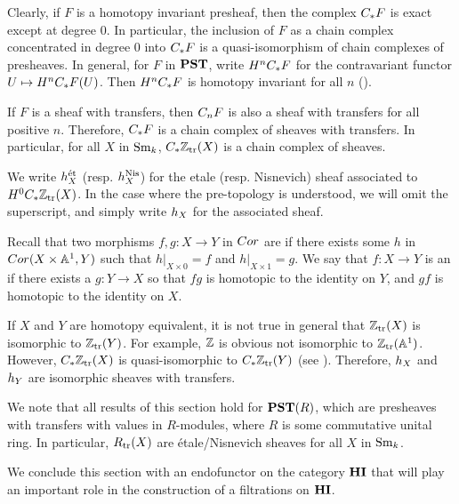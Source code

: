 Clearly, if $F$ is a homotopy invariant presheaf, then the complex 
$\suslC F$ is exact except at degree $0$. In particular, the
inclusion of $F$ as a chain complex concentrated in degree $0$ into
$\suslC F$ is a quasi-isomorphism of chain complexes of presheaves.
In general, for $F$ in $\PST$, write $H^n \suslC F$ for the 
contravariant functor $U \mapsto H^n \suslC F(U)$. Then $H^n \suslC F$
is homotopy invariant for all $n$ (\cite[2.19]{MVW}).

If $F$ is a sheaf with transfers, then $\suslC[n] F$ is also a sheaf
with transfers for all positive $n$. Therefore, $\suslC F$ is a
chain complex of sheaves with transfers. In particular, for all
$X$ in $\Sm$, $\suslC \Ztr(X)$ is a chain complex of sheaves.

\begin{defn}\label{def_hSX}
We write $\hS{X}^{\mathrm{\acute{e}t}}$ (resp. $\hS{X}^{\Nis}$) 
for the etale (resp. Nisnevich) sheaf associated to $H^0 \suslC 
\Ztr(X)$. In the case where the pre-topology is understood, we will
omit the superscript, and simply write $\hS{X}$ for the associated
sheaf.
\end{defn}

\begin{rmk}
Recall that two morphisms $f, g: X \to Y$ in $\Cor$ are 
 if there exists some $h$ in $\Cor(X \times 
\A^1, Y)$ such that $h|_{X \times 0} = f$ and $h|_{X \times 1} = 
g$. We say that $f: X \to Y$ is an  if there exists a $g: Y \to X$ so that $fg$ is 
homotopic to the identity on $Y$, and $gf$ is homotopic to the 
identity on $X$.

If $X$ and $Y$ are homotopy equivalent, it is not true in general 
that $\Ztr(X)$ is isomorphic to $\Ztr(Y)$. For example, $\Z$ is
obvious not isomorphic to $\Ztr(\A^1)$. However, $\suslC \Ztr(X)$
is quasi-isomorphic to $\suslC \Ztr(Y)$ (see \cite[2.26]{MVW}).
Therefore, $\hS{X}$ and $\hS{Y}$ are isomorphic sheaves with 
transfers.
\end{rmk}

\begin{rmk}
We note that all results of this section hold for $\PST(R)$, which
are presheaves with transfers with values in $R$-modules, where $R$
is some commutative unital ring. In particular, $\Rtr(X)$ are
\'etale/Nisnevich sheaves for all $X$ in $\Sm$.
\end{rmk}

We conclude this section with an endofunctor on the category $\HI$
that will play an important role in the construction of a 
filtrations on $\HI$.


